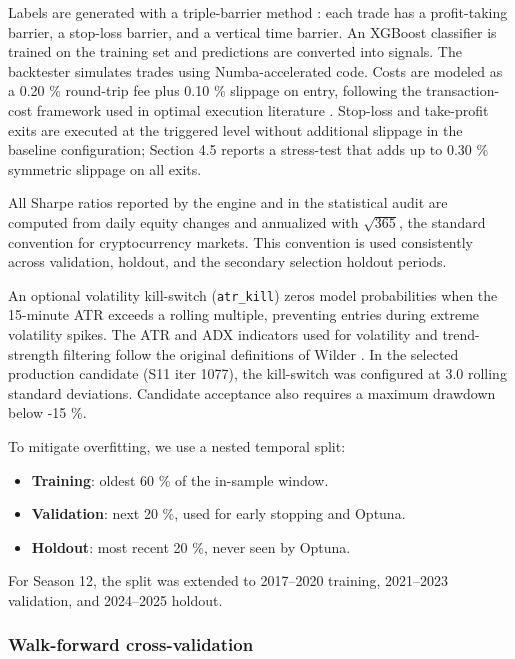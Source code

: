 \documentclass[11pt,a4paper]{article}
\begin{document}
Labels are generated with a triple-barrier method \citep{prado_2018}: each trade has a profit-taking barrier, a stop-loss barrier, and a vertical time barrier. An XGBoost classifier \citep{chen_2016} is trained on the training set and predictions are converted into signals. The backtester simulates trades using Numba-accelerated code. Costs are modeled as a 0.20 \% round-trip fee plus 0.10 \% slippage on entry, following the transaction-cost framework used in optimal execution literature \citep{almgren_2001}. Stop-loss and take-profit exits are executed at the triggered level without additional slippage in the baseline configuration; Section 4.5 reports a stress-test that adds up to 0.30 \% symmetric slippage on all exits.

All Sharpe ratios reported by the engine and in the statistical audit are computed from daily equity changes and annualized with \(\sqrt{365}\), the standard convention for cryptocurrency markets. This convention is used consistently across validation, holdout, and the secondary selection holdout periods.

An optional volatility kill-switch (\texttt{atr\_kill}) zeros model probabilities when the 15-minute ATR exceeds a rolling multiple, preventing entries during extreme volatility spikes. The ATR and ADX indicators used for volatility and trend-strength filtering follow the original definitions of Wilder \citep{wilder_1978}. In the selected production candidate (S11 iter 1077), the kill-switch was configured at 3.0 rolling standard deviations. Candidate acceptance also requires a maximum drawdown below -15 \%.

To mitigate overfitting, we use a nested temporal split:

\begin{itemize}
\item
  \textbf{Training}: oldest 60 \% of the in-sample window.
\item
  \textbf{Validation}: next 20 \%, used for early stopping and Optuna.
\item
  \textbf{Holdout}: most recent 20 \%, never seen by Optuna.
\end{itemize}

For Season 12, the split was extended to 2017--2020 training, 2021--2023 validation, and 2024--2025 holdout.

\subsubsection{Walk-forward cross-validation}\label{walk-forward}
\end{document}
